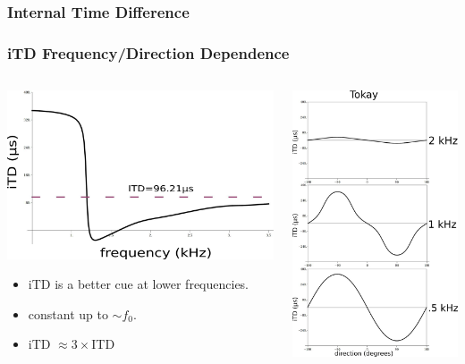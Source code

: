 \documentclass{beamer}
\begin{document}
\subsubsection{Internal Time Difference}
\begin{frame}[t]
\frametitle{iTD Frequency/Direction Dependence}
\begin{columns}
\begin{column}{0.5\textwidth}
 \includegraphics[width = 6 cm]{Diagrams/Presentation/iTDspectrum.png}
\begin{exampleblock}{}
\small
 \begin{itemize}
  \item iTD is a better cue at lower frequencies.
  \item constant up to $\sim f_0$.
  \item iTD $\approx  3\times$ITD
 \end{itemize}
\end{exampleblock}
\end{column}
     \begin{column}{0.5\textwidth}
     \flushright
 \includegraphics[width = 3.8 cm]{Diagrams/Presentation/iTDdirection.png}
\end{column}
\end{columns}
\end{frame}
\end{document}
